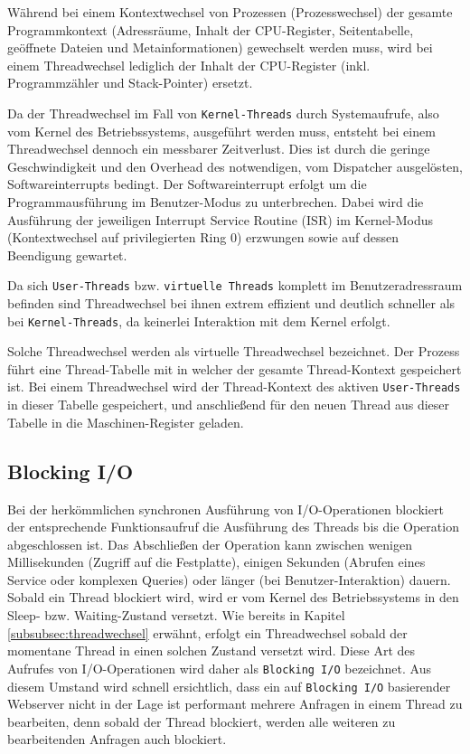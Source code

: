 Während bei einem Kontextwechsel von Prozessen (Prozesswechsel) der gesamte Programmkontext (Adressräume, Inhalt der CPU-Register,
Seitentabelle, geöffnete Dateien und Metainformationen)
gewechselt werden muss, wird bei einem Threadwechsel lediglich der Inhalt der CPU-Register (inkl. Programmzähler und Stack-Pointer)
ersetzt.\parencite{Mosberger2002}

\noindent
Da der Threadwechsel im Fall von \verb|Kernel-Threads| durch Systemaufrufe, also vom Kernel des Betriebssystems, ausgeführt werden muss, entsteht
bei einem Threadwechsel dennoch ein messbarer Zeitverlust.
Dies ist durch die geringe Geschwindigkeit und den Overhead des notwendigen, vom Dispatcher ausgelösten, Softwareinterrupts bedingt.
Der Softwareinterrupt erfolgt um die Programmausführung im Benutzer-Modus zu unterbrechen.
Dabei wird die Ausführung der jeweiligen Interrupt Service Routine (ISR) im
Kernel-Modus (Kontextwechsel auf privilegierten Ring 0) erzwungen sowie auf dessen Beendigung gewartet.

Da sich \verb|User-Threads| bzw. \verb|virtuelle Threads| komplett im Benutzeradressraum befinden sind Threadwechsel
bei ihnen extrem effizient und deutlich schneller als bei \verb|Kernel-Threads|, da keinerlei Interaktion mit dem Kernel erfolgt.

Solche Threadwechsel werden als virtuelle Threadwechsel bezeichnet.
Der Prozess führt eine Thread-Tabelle mit in welcher der gesamte Thread-Kontext gespeichert ist.
Bei einem Threadwechsel wird der Thread-Kontext des aktiven \verb|User-Threads| in dieser Tabelle gespeichert, und anschließend für den neuen Thread
aus dieser Tabelle in die Maschinen-Register geladen.
\parencite[Kapitel 2.2.6 Thread Scheduling]{Tanenbaum2016}
\newpage
\subsection{Blocking I/O}
\label{subsec:blocking-i/o}
Bei der herkömmlichen synchronen Ausführung von I/O-Operationen blockiert der entsprechende Funktionsaufruf die Ausführung des
Threads bis die Operation abgeschlossen ist. Das Abschließen der Operation kann zwischen wenigen Millisekunden (Zugriff auf die Festplatte),
einigen Sekunden (Abrufen eines Service oder komplexen Queries) oder länger (bei Benutzer-Interaktion) dauern.
Sobald ein Thread blockiert wird, wird er vom Kernel des Betriebssystems in den Sleep- bzw. Waiting-Zustand versetzt.
Wie bereits in Kapitel \ref{subsubsec:threadwechsel} erwähnt, erfolgt ein Threadwechsel sobald der momentane Thread in einen solchen Zustand
versetzt wird.
Diese Art des Aufrufes von I/O-Operationen wird daher als \verb|Blocking I/O| bezeichnet.
Aus diesem Umstand wird schnell ersichtlich, dass ein auf \verb|Blocking I/O| basierender Webserver nicht in der Lage ist
performant mehrere Anfragen in einem Thread zu bearbeiten, denn sobald der Thread blockiert, werden alle weiteren zu bearbeitenden Anfragen
auch blockiert.
